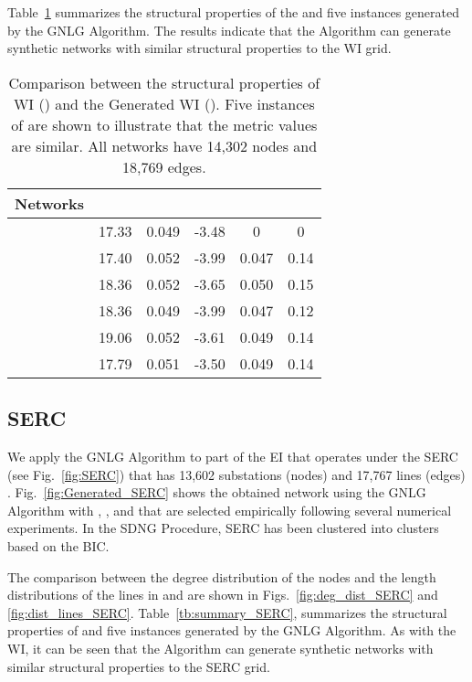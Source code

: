 \documentclass[10pt,journal]{IEEEtran}
\begin{document}
 Table~\ref{tb:summary_WI} summarizes the structural properties of the  and five instances generated by the GNLG Algorithm. The results indicate that the Algorithm can generate synthetic networks with similar structural properties to the WI grid.


\begin{table}[t]
\centering
\vspace*{-.1cm}
\caption{Comparison between the structural properties of WI () and the Generated WI (). Five instances of  are shown to illustrate that the metric values are similar. All networks have 14,302 nodes and 18,769 edges.}
\vspace*{-0.2cm}
\footnotesize
\begin{tabular}{|l|c|c|c|c|c|}
\hline
Networks& &&   & & \\
\hline
 & 17.33 &0.049 & -3.48 & 0&0\\
\hline
 & 17.40 & 0.052 & -3.99 &0.047& 0.14\\
\hline
 & 18.36 & 0.052 & -3.65 &0.050& 0.15\\
\hline
 & 18.36 & 0.049 & -3.99 &0.047& 0.12\\
\hline
 & 19.06 & 0.052 & -3.61 &0.049& 0.14\\
\hline
 & 17.79 & 0.051 & -3.50&0.049 & 0.14\\
\hline
\end{tabular}
\label{tb:summary_WI}
\end{table}
\normalsize


 \subsection{SERC}
We apply the GNLG Algorithm to part of the EI that operates under the SERC (see Fig.~\ref{fig:SERC}) that has 13,602 substations (nodes) and 17,767 lines (edges) . Fig.~\ref{fig:Generated_SERC} shows the obtained network using the GNLG Algorithm with , ,  and  that are selected empirically  following several numerical experiments. In the SDNG Procedure, SERC has been clustered into  clusters based on the BIC. 

The comparison between the degree distribution of the nodes and the length distributions of the lines in  and  are shown in Figs.~\ref{fig:deg_dist_SERC} and \ref{fig:dist_lines_SERC}. Table~\ref{tb:summary_SERC}, summarizes the structural properties of  and five instances generated by the GNLG Algorithm. As with the WI, it can be seen that the Algorithm can generate synthetic networks with similar structural properties to the SERC grid.
\end{document}
